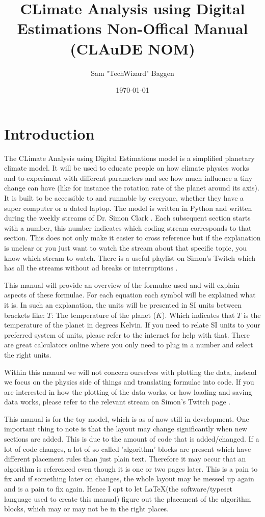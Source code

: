 \documentclass{article}
\title{CLimate Analysis using Digital Estimations Non-Offical Manual (CLAuDE NOM)}
\author{Sam "TechWizard" Baggen}
\date{\today}
\begin{document}
\maketitle

\tableofcontents

\section{Introduction}

The CLimate Analysis using Digital Estimations model is a simplified planetary climate model. It will be used to educate people on how climate physics works and to experiment with different 
parameters and see how much influence a tiny change can have (like for instance the rotation rate of the planet around its axis). It is built to be accessible to and runnable by everyone, 
whether they have a super computer or a dated laptop. The model is written in Python and written during the weekly streams of Dr. Simon Clark \cite{twitch}. Each subsequent section starts with a 
number, this number indicates which coding stream corresponds to that section. This does not only make it easier to cross reference but if the explanation is unclear or you just want to watch 
the stream about that specific topic, you know which stream to watch. There is a useful playlist on Simon's Twitch which has all the streams without ad breaks or interruptions \cite{playlist}. 

This manual will provide an overview of the formulae used and will explain aspects of these formulae. For each equation each symbol will be explained what it is. In such an explanation, the units 
will be presented in SI units \cite{SI} between brackets like: $T$: The temperature of the planet ($K$). Which indicates that $T$ is the temperature of the planet in degrees Kelvin. If you need 
to relate SI units to your preferred system of units, please refer to the internet for help with that. There are great calculators online where you only need to plug in a number and select the 
right units.

Within this manual we will not concern ourselves with plotting the data, instead we focus on the physics side of things and translating formulae into code. If you are interested in how the
plotting of the data works, or how loading and saving data works, please refer to the relevant stream on Simon's Twitch page \cite{twitch}.

This manual is for the toy model, which is as of now still in development. One important thing to note is that the layout may change significantly when new sections are added. This is due to the amount of code that is added/changed. If a lot of code changes, a lot of so called
'algorithm' blocks are present which have different placement rules than just plain text. Therefore it may occur that an algorithm is referenced even though it is one or two pages later. This is 
a pain to fix and if something later on changes, the whole layout may be messed up again and is a pain to fix again. Hence I opt to let \LaTeX (the software/typeset language used to create this 
manual) figure out the placement of the algorithm blocks, which may or may not be in the right places.
\end{document}
